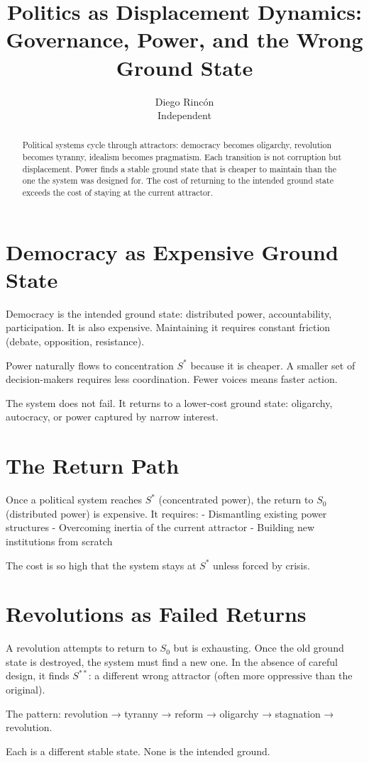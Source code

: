 \documentclass[12pt]{article}
\title{Politics as Displacement Dynamics:\\
Governance, Power, and the Wrong Ground State}
\author{Diego Rincón\\
\small Independent}
\date{}
\begin{document}
\maketitle

\begin{abstract}
Political systems cycle through attractors: democracy becomes oligarchy, revolution becomes tyranny, idealism becomes pragmatism. Each transition is not corruption but displacement. Power finds a stable ground state that is cheaper to maintain than the one the system was designed for. The cost of returning to the intended ground state exceeds the cost of staying at the current attractor.
\end{abstract}

\section{Democracy as Expensive Ground State}

Democracy is the intended ground state: distributed power, accountability, participation. It is also expensive. Maintaining it requires constant friction (debate, opposition, resistance).

Power naturally flows to concentration $S^*$ because it is cheaper. A smaller set of decision-makers requires less coordination. Fewer voices means faster action.

The system does not fail. It returns to a lower-cost ground state: oligarchy, autocracy, or power captured by narrow interest.

\section{The Return Path}

Once a political system reaches $S^*$ (concentrated power), the return to $S_0$ (distributed power) is expensive. It requires:
- Dismantling existing power structures
- Overcoming inertia of the current attractor
- Building new institutions from scratch

The cost is so high that the system stays at $S^*$ unless forced by crisis.

\section{Revolutions as Failed Returns}

A revolution attempts to return to $S_0$ but is exhausting. Once the old ground state is destroyed, the system must find a new one. In the absence of careful design, it finds $S^{**}$: a different wrong attractor (often more oppressive than the original).

The pattern: revolution → tyranny → reform → oligarchy → stagnation → revolution.

Each is a different stable state. None is the intended ground.
\end{document}
